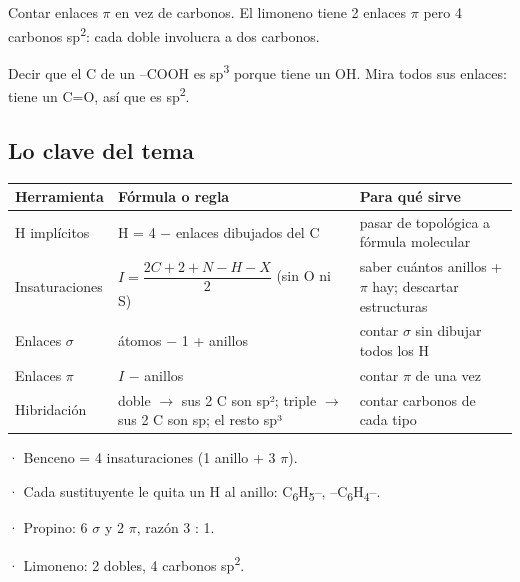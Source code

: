 \begin{ojo} Contar enlaces \ensuremath{\pi} en vez de carbonos. El limoneno tiene 2 enlaces \ensuremath{\pi} pero 4 carbonos sp\textsuperscript{2}: cada doble involucra a dos carbonos.\end{ojo}
 
\begin{ojo} Decir que el C de un --COOH es sp\textsuperscript{3} porque tiene un OH. Mira todos sus enlaces: tiene un C=O, así que es sp\textsuperscript{2}.\end{ojo}
\subsection{Lo clave del tema}
\begin{center}\small
\begin{tabularx}{\linewidth}{@{}>{\raggedright\arraybackslash\hsize=0.53\hsize}X>{\raggedright\arraybackslash\hsize=1.24\hsize}X>{\raggedright\arraybackslash\hsize=1.24\hsize}X@{}}
\toprule
\textbf{Herramienta} & \textbf{Fórmula o regla} & \textbf{Para qué sirve} \\
\midrule
H implícitos & H = 4 \ensuremath{-} enlaces dibujados del C & pasar de topológica a fórmula molecular \\
Insaturaciones & $I = \dfrac{2C + 2 + N - H - X}{2}$ (sin O ni S) & saber cuántos anillos + \ensuremath{\pi} hay; descartar estructuras \\
Enlaces \ensuremath{\sigma} & átomos \ensuremath{-} 1 + anillos & contar \ensuremath{\sigma} sin dibujar todos los H \\
Enlaces \ensuremath{\pi} & $I$ \ensuremath{-} anillos & contar \ensuremath{\pi} de una vez \\
Hibridación & doble \ensuremath{\rightarrow} sus 2 C son sp²; triple \ensuremath{\rightarrow} sus 2 C son sp; el resto sp³ & contar carbonos de cada tipo \\
\bottomrule
\end{tabularx}
\end{center}
  
\begin{clave}[{Recuerda}] · Benceno = 4 insaturaciones (1 anillo + 3 \ensuremath{\pi}).\par · Cada sustituyente le quita un H al anillo: C\textsubscript{6}H\textsubscript{5}--, --C\textsubscript{6}H\textsubscript{4}--.\par · Propino: 6 $\sigma$ y 2 $\pi$, razón 3 : 1.\par · Limoneno: 2 dobles, 4 carbonos sp\textsuperscript{2}.\end{clave}
  
